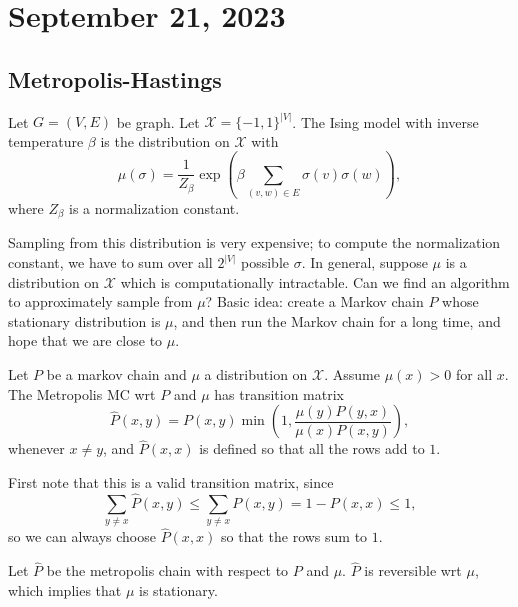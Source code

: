 \section{September 21, 2023}

\subsection{Metropolis-Hastings}

\begin{definition}

Let $G=(V,E)$ be graph. Let $\mathcal{X}=\{-1,1\}^{\vert V\vert}$. The \ac{Ising model} with inverse temperature $\beta$ is the distribution on $\mathcal{X}$ with 
\[\mu(\sigma) = \frac{1}{Z_{\beta}}\exp\left(\beta \sum_{(v,w)\in E}\sigma(v)\sigma(w)\right),\]
where $Z_{\beta}$ is a normalization constant. 
\end{definition}

Sampling from this distribution is very expensive; to compute the normalization constant, we have to sum over all $2^{\vert V\vert}$ possible $\sigma$. In general, suppose $\mu$ is a distribution on $\mathcal{X}$ which is computationally intractable. Can we find an algorithm to approximately sample from $\mu$? Basic idea: create a Markov chain $P$ whose stationary distribution is $\mu$, and then run the Markov chain for a long time, and hope that we are close to $\mu$. 

\begin{definition}

Let $P$ be a markov chain and $\mu$ a distribution on $\mathcal{X}$. Assume $\mu(x) > 0$ for all $x$. The Metropolis MC wrt $P$ and $\mu$ has transition matrix 
\[\hat{P}(x,y) = P(x,y)\min\left(1, \frac{\mu(y)P(y,x)}{\mu(x)P(x,y)}\right),\]
whenever $x\neq y$, and $\hat{P}(x,x)$ is defined so that all the rows add to $1$. 
\end{definition}
First note that this is a valid transition matrix, since
\[\sum_{y\neq x}\hat{P}(x,y) \leq \sum_{y\neq x}P(x,y) = 1 - P(x,x)\leq 1,\]
so we can always choose $\hat{P}(x,x)$ so that the rows sum to $1$. 

\begin{theorem}
\proplabel

Let $\hat{P}$ be the metropolis chain with respect to $P$ and $\mu$. $\hat{P}$ is reversible wrt $\mu$, which implies that $\mu$ is stationary. 
\end{theorem}

